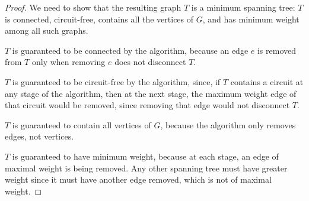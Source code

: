 \documentclass[14pt]{extarticle}
\begin{document}
\begin{proof}
We need to show that the resulting graph \(T\) is a minimum spanning tree: \(T\) is connected, circuit-free, contains all 
the vertices of \(G\), and has minimum weight among all such graphs.

\(T\) is guaranteed to be connected by the algorithm, because an edge \(e\) is removed from \(T\) only when removing \(e\)
does not disconnect \(T\).

\(T\) is guaranteed to be circuit-free by the algorithm, since, if \(T\) contains a circuit at any stage of the 
algorithm, then at the next stage, the maximum weight edge of that circuit would be removed, since removing that edge would
not disconnect \(T\).

\(T\) is guaranteed to contain all vertices of \(G\), because the algorithm only removes edges, not vertices.

\(T\) is guaranteed to have minimum weight, because at each stage, an edge of maximal weight is being removed. Any other
spanning tree must have greater weight since it must have another edge removed, which is not of maximal weight.
\end{proof}
\end{document}
